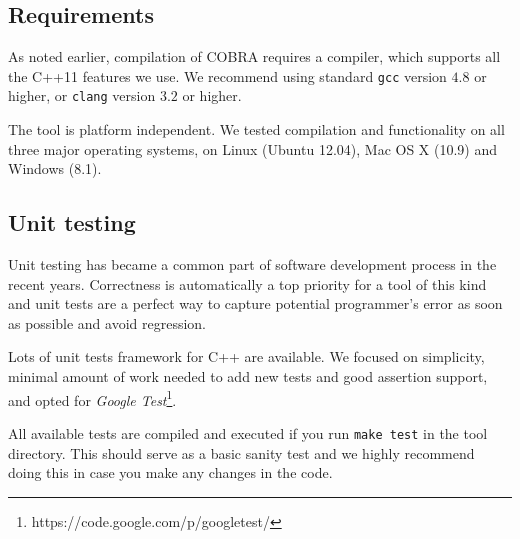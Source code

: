 \subsection{Requirements}
As noted earlier, compilation of COBRA requires a compiler,
  which supports all the C++11 features we use.
We recommend using standard \texttt{gcc} version $4.8$ or higher, or
 \texttt{clang} version $3.2$ or higher.

The tool is platform independent.
  We tested compilation and functionality on
  all three major operating systems, on Linux (Ubuntu 12.04),
  Mac OS X (10.9) and Windows (8.1).

\subsection{Unit testing}
Unit testing has became a common part of software development process
  in the recent years.
Correctness is automatically a top priority for a tool of this kind and
  unit tests are a perfect way to capture potential programmer's error
  as soon as possible and avoid regression.

Lots of unit tests framework for C++ are available.
We focused on simplicity, minimal amount of work needed to add new tests
  and good assertion support, and opted for
  \emph{Google Test}\footnote{https://code.google.com/p/googletest/}.

All available tests are compiled and executed if you run \texttt{make test}
  in the tool directory.
This should serve as a basic sanity test and we highly recommend
  doing this in case you make any changes in the code.

